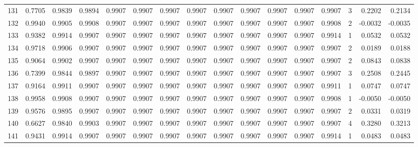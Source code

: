 \begin{tabular}{lrrrrrrrrrrrrrrr}
131 &      0.7705 &  0.9839 &  0.9894 &  0.9907 &  0.9907 &  0.9907 &  0.9907 &  0.9907 &  0.9907 &  0.9907 &   0.9907 &     0.9907 &      3 &                    0.2202 &                     0.2134 \\
132 &      0.9940 &  0.9905 &  0.9908 &  0.9907 &  0.9907 &  0.9907 &  0.9907 &  0.9907 &  0.9907 &  0.9907 &   0.9907 &     0.9908 &      2 &                   -0.0032 &                    -0.0035 \\
133 &      0.9382 &  0.9914 &  0.9907 &  0.9907 &  0.9907 &  0.9907 &  0.9907 &  0.9907 &  0.9907 &  0.9907 &   0.9907 &     0.9914 &      1 &                    0.0532 &                     0.0532 \\
134 &      0.9718 &  0.9906 &  0.9907 &  0.9907 &  0.9907 &  0.9907 &  0.9907 &  0.9907 &  0.9907 &  0.9907 &   0.9907 &     0.9907 &      2 &                    0.0189 &                     0.0188 \\
135 &      0.9064 &  0.9902 &  0.9907 &  0.9907 &  0.9907 &  0.9907 &  0.9907 &  0.9907 &  0.9907 &  0.9907 &   0.9907 &     0.9907 &      2 &                    0.0843 &                     0.0838 \\
136 &      0.7399 &  0.9844 &  0.9897 &  0.9907 &  0.9907 &  0.9907 &  0.9907 &  0.9907 &  0.9907 &  0.9907 &   0.9907 &     0.9907 &      3 &                    0.2508 &                     0.2445 \\
137 &      0.9164 &  0.9911 &  0.9907 &  0.9907 &  0.9907 &  0.9907 &  0.9907 &  0.9907 &  0.9907 &  0.9907 &   0.9907 &     0.9911 &      1 &                    0.0747 &                     0.0747 \\
138 &      0.9958 &  0.9908 &  0.9907 &  0.9907 &  0.9907 &  0.9907 &  0.9907 &  0.9907 &  0.9907 &  0.9907 &   0.9907 &     0.9908 &      1 &                   -0.0050 &                    -0.0050 \\
139 &      0.9576 &  0.9895 &  0.9907 &  0.9907 &  0.9907 &  0.9907 &  0.9907 &  0.9907 &  0.9907 &  0.9907 &   0.9907 &     0.9907 &      2 &                    0.0331 &                     0.0319 \\
140 &      0.6627 &  0.9840 &  0.9903 &  0.9907 &  0.9907 &  0.9907 &  0.9907 &  0.9907 &  0.9907 &  0.9907 &   0.9907 &     0.9907 &      4 &                    0.3280 &                     0.3213 \\
141 &      0.9431 &  0.9914 &  0.9907 &  0.9907 &  0.9907 &  0.9907 &  0.9907 &  0.9907 &  0.9907 &  0.9907 &   0.9907 &     0.9914 &      1 &                    0.0483 &                     0.0483 \\

\end{tabular}

